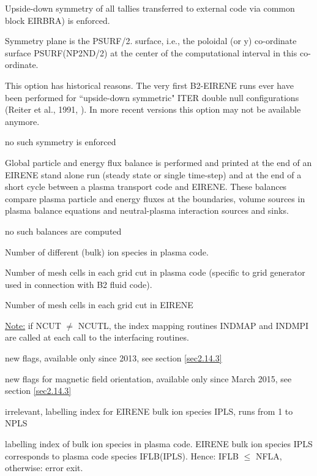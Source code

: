 \begin{list}{ }{}
\item[{\bf LSYMET }]
\begin{list}{ }{}
\item[{=.TRUE. }]
Upside-down symmetry of all tallies transferred to external code
via common block EIRBRA) is enforced.

Symmetry plane is the PSURF/2. surface, i.e., the
poloidal (or y) co-ordinate surface
PSURF(NP2ND/2) at the center of the computational
interval in this co-ordinate.

This option has historical reasons. The very first B2-EIRENE runs
ever have been performed for ``upside-down symmetric" ITER double
null configurations (Reiter et al., 1991, \cite{kn:Reiter91b}). In
more recent versions this option may not be available anymore.

\item[{=.FALSE. }]
no such symmetry is enforced
\end{list}
\item[{\bf LBALAN }]
\begin{list}{ }{}
\item[{=.TRUE. }]
Global particle and energy flux balance is performed and printed at
the end of an EIRENE stand alone run (steady state or single time-step)
and at the end of a short cycle between
a plasma transport code and EIRENE. These balances compare plasma
particle and energy fluxes at the boundaries, volume sources in plasma
balance equations and
neutral-plasma interaction sources and sinks.
\item[{=.FALSE. }]
no such balances are computed
\end{list}

\item[{\bf NFLA }]
Number of different (bulk) ion species in plasma code.
\item[{\bf NCUTB }]
Number of mesh cells in each grid cut in plasma code
(specific to grid generator used in connection with B2 fluid code).
\item[{\bf NCUTL }]
Number of mesh cells in each grid cut in EIRENE

\underline{Note:} if NCUT $\ne$ NCUTL,
the index mapping routines
INDMAP and INDMPI are called
at each call to the interfacing routines.

\item[{\bf MSHFRM, NTRFRM, NFULL}]
new flags, available only since 2013, see section \ref{sec2.14.3}
\item[{\bf IBRAD, IBPOL, IBTOR}]
new flags for magnetic field orientation, available only since March 2015, see section \ref{sec2.14.3}
\item[{\bf I }]
irrelevant, labelling index for EIRENE bulk ion species IPLS, runs from 1 to NPLS
\item[{\bf IFLB }]
\begin{list}{ }{}
\item[{$>$ 0 }]
labelling index of bulk ion species in plasma code. EIRENE bulk ion
species IPLS corresponds to plasma code species IFLB(IPLS). Hence:
IFLB $\le$ NFLA, otherwise: error exit.



\end{list}
\end{list}
